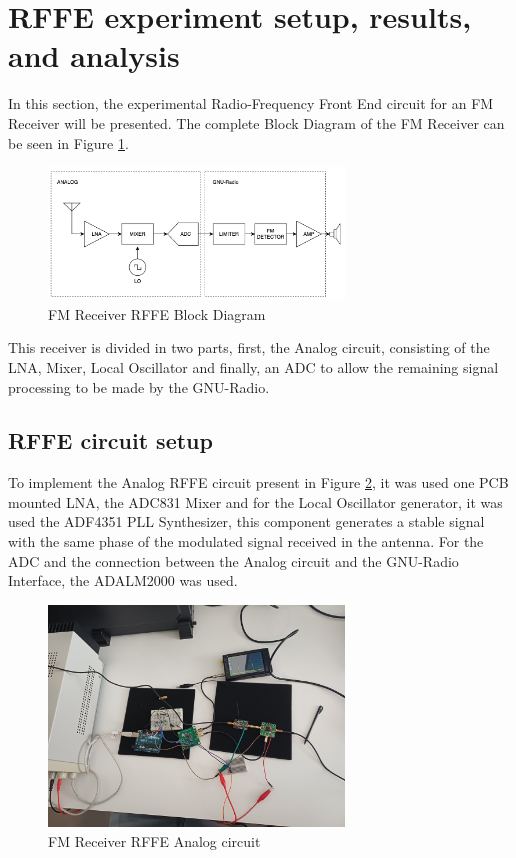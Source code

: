 \section{RFFE experiment setup, results, and analysis}

In this section, the experimental Radio-Frequency Front End circuit for an FM Receiver will be presented. The complete Block Diagram of the FM Receiver can be seen in Figure \ref{fig:RFFE_Block}.

\begin{figure}[H]
    \centering
    \includegraphics*[width=0.7\textwidth]{Images/RFFE_Block.png}
    \caption{FM Receiver RFFE Block Diagram}
    \label{fig:RFFE_Block}
\end{figure}

This receiver is divided in two parts, first, the Analog circuit, consisting of the LNA, Mixer, Local Oscillator and finally, an ADC to allow the remaining signal processing to be made by the GNU-Radio.

\subsection{RFFE circuit setup}

To implement the Analog RFFE circuit present in Figure \ref{fig:RFFE_Circuit}, it was used one PCB mounted LNA, the ADC831 Mixer and for the Local Oscillator generator, it was used the ADF4351 PLL Synthesizer, this component generates a stable signal with the same phase of the modulated signal received in the antenna. For the ADC and the connection between the Analog circuit and the GNU-Radio Interface, the ADALM2000 was used. 

\begin{figure}[H]
    \centering
    \includegraphics*[width=0.7\textwidth]{Images/RFFE_Circuit.jpeg}
    \caption{FM Receiver RFFE Analog circuit}
    \label{fig:RFFE_Circuit}
\end{figure}

